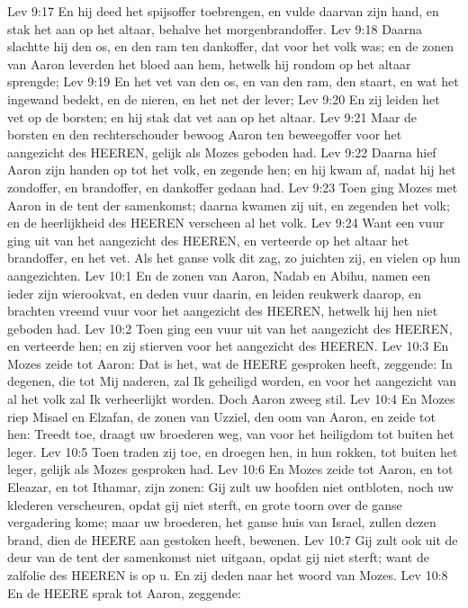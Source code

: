 Lev 9:17  En hij deed het spijsoffer toebrengen, en vulde daarvan zijn hand, en stak het aan op het altaar, behalve het morgenbrandoffer.
Lev 9:18  Daarna slachtte hij den os, en den ram ten dankoffer, dat voor het volk was; en de zonen van Aaron leverden het bloed aan hem, hetwelk hij rondom op het altaar sprengde;
Lev 9:19  En het vet van den os, en van den ram, den staart, en wat het ingewand bedekt, en de nieren, en het net der lever;
Lev 9:20  En zij leiden het vet op de borsten; en hij stak dat vet aan op het altaar.
Lev 9:21  Maar de borsten en den rechterschouder bewoog Aaron ten beweegoffer voor het aangezicht des HEEREN, gelijk als Mozes geboden had.
Lev 9:22  Daarna hief Aaron zijn handen op tot het volk, en zegende hen; en hij kwam af, nadat hij het zondoffer, en brandoffer, en dankoffer gedaan had.
Lev 9:23  Toen ging Mozes met Aaron in de tent der samenkomst; daarna kwamen zij uit, en zegenden het volk; en de heerlijkheid des HEEREN verscheen al het volk.
Lev 9:24  Want een vuur ging uit van het aangezicht des HEEREN, en verteerde op het altaar het brandoffer, en het vet. Als het ganse volk dit zag, zo juichten zij, en vielen op hun aangezichten.
Lev 10:1  En de zonen van Aaron, Nadab en Abihu, namen een ieder zijn wierookvat, en deden vuur daarin, en leiden reukwerk daarop, en brachten vreemd vuur voor het aangezicht des HEEREN, hetwelk hij hen niet geboden had.
Lev 10:2  Toen ging een vuur uit van het aangezicht des HEEREN, en verteerde hen; en zij stierven voor het aangezicht des HEEREN.
Lev 10:3  En Mozes zeide tot Aaron: Dat is het, wat de HEERE gesproken heeft, zeggende: In degenen, die tot Mij naderen, zal Ik geheiligd worden, en voor het aangezicht van al het volk zal Ik verheerlijkt worden. Doch Aaron zweeg stil.
Lev 10:4  En Mozes riep Misael en Elzafan, de zonen van Uzziel, den oom van Aaron, en zeide tot hen: Treedt toe, draagt uw broederen weg, van voor het heiligdom tot buiten het leger.
Lev 10:5  Toen traden zij toe, en droegen hen, in hun rokken, tot buiten het leger, gelijk als Mozes gesproken had.
Lev 10:6  En Mozes zeide tot Aaron, en tot Eleazar, en tot Ithamar, zijn zonen: Gij zult uw hoofden niet ontbloten, noch uw klederen verscheuren, opdat gij niet sterft, en grote toorn over de ganse vergadering kome; maar uw broederen, het ganse huis van Israel, zullen dezen brand, dien de HEERE aan gestoken heeft, bewenen.
Lev 10:7  Gij zult ook uit de deur van de tent der samenkomst niet uitgaan, opdat gij niet sterft; want de zalfolie des HEEREN is op u. En zij deden naar het woord van Mozes.
Lev 10:8  En de HEERE sprak tot Aaron, zeggende:
